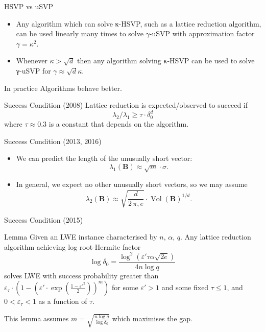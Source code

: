 \documentclass[presentation,smaller]{beamer}
\renewcommand{\vec}[1]{\mathbf{#1}\xspace}
\DeclareMathOperator{\Vol}{Vol}
\begin{document}
\begin{frame}[label={sec:org6b44833}]{HSVP vs uSVP}
\begin{itemize}
\item Any algorithm which can solve κ-HSVP, such as a lattice reduction algorithm, can be used linearly many times to solve \(γ\)-uSVP with approximation factor \(γ=κ^2\).
\item Whenever \(κ > \sqrt{d}\) then any algorithm solving κ-HSVP can be used to solve γ-uSVP for \(γ ≈ \sqrt{d} κ\).
\end{itemize}

\pause

\begin{block}{In practice}
Algorithms behave better.
\end{block}
\end{frame}

\begin{frame}[label={sec:orge31a911}]{Success Condition (2008)}
Lattice reduction is expected/observed  to succeed if \[λ_2/λ_1 ≥ τ ⋅ δ_0^d\] where \(τ ≈ 0.3\) is a constant that depends on the algorithm.
\end{frame}

\begin{frame}[label={sec:orge0e74db}]{Success Condition (2013, 2016)}
\begin{itemize}
\item We can predict the length of the unusually short vector: \[λ_1(\vec{B}) ≈ \sqrt{m} ⋅ σ.\]

\item In general, we expect no other unusually short vectors, so we may assume  \[λ_2(\vec{B}) ≈ \sqrt{\frac{d}{2\,π,e}} ⋅ \Vol(\vec{B})^{1/d}.\]
\end{itemize}
\end{frame}

\begin{frame}[label={sec:org8d0592f}]{Success Condition (2015)}
\begin{block}{Lemma }
Given an LWE instance characterised by \(n\), \(α\), \(q\). Any lattice reduction algorithm achieving log root-Hermite factor \[\log{δ_0} = \frac{\log^2{\left(ε' τ α \sqrt{2e}\right)}}{4 n \log{q}}\] solves LWE with success probability greater than \(ε_τ ⋅ \left( 1-\left(ε' ⋅  \exp{\left(\frac{1-ε'^2}{2}\right)}\right)^m \right)\) for some \(ε' > 1\) and some fixed \(τ ≤ 1\), and \(0 < ε_τ < 1\) as a function of \(τ\).
\end{block}

This lemma assumes \(m = \sqrt{\frac{n \log q}{\log δ_0}}\) which maximises the gap.
\end{frame}
\end{document}
